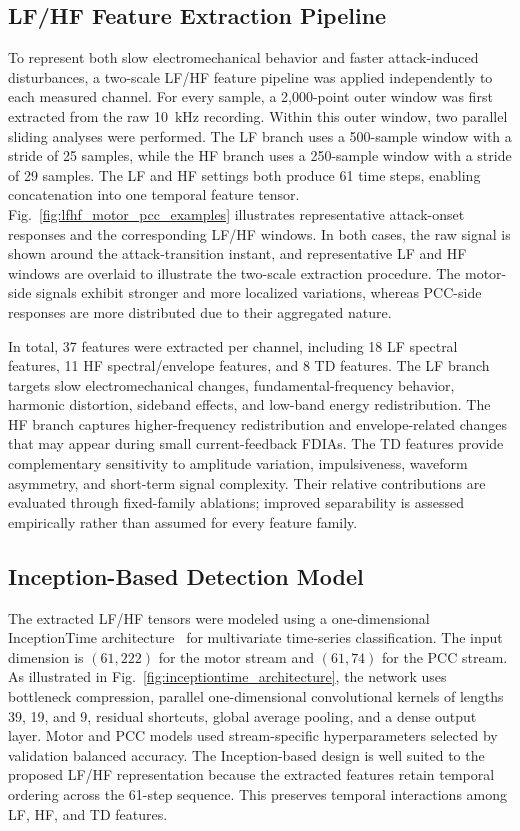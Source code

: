 \documentclass[letterpaper,journal]{IEEEtran}
\begin{document}
\subsection{LF/HF Feature Extraction Pipeline}
\label{sec:lfhf_features}


To represent both slow electromechanical behavior and faster attack-induced disturbances, a two-scale LF/HF feature pipeline was applied independently to each measured channel. For every sample, a 2{,}000-point outer window was first extracted from the raw 10~kHz recording. Within this outer window, two parallel sliding analyses were performed. The LF branch uses a 500-sample window with a stride of 25 samples, while the HF branch uses a 250-sample window with a stride of 29 samples. The LF and HF settings both produce 61 time steps, enabling concatenation into one temporal feature tensor. 
Fig.~\ref{fig:lfhf_motor_pcc_examples} illustrates representative attack-onset responses and the corresponding LF/HF windows. In both cases, the raw signal is shown around the attack-transition instant, and representative LF and HF windows are overlaid to illustrate the two-scale extraction procedure. The motor-side signals exhibit stronger and more localized variations, whereas PCC-side responses are more distributed due to their aggregated nature.

In total, 37 features were extracted per channel, including 18 LF spectral features, 11 HF spectral/envelope features, and 8 TD features. The LF branch targets slow electromechanical changes, fundamental-frequency behavior, harmonic distortion, sideband effects, and low-band energy redistribution. The HF branch captures higher-frequency redistribution and envelope-related changes that may appear during small current-feedback FDIAs. The TD features provide complementary sensitivity to amplitude variation, impulsiveness, waveform asymmetry, and short-term signal complexity.
Their relative contributions are evaluated through fixed-family ablations; improved separability is assessed empirically rather than assumed for every feature family.

\subsection{Inception-Based Detection Model}
\label{sec:inception_model}

The extracted LF/HF tensors were modeled using a one-dimensional InceptionTime architecture~\cite{fawaz2020inceptiontime} for multivariate time-series classification. The input dimension is $(61,222)$ for the motor stream and $(61,74)$ for the PCC stream. As illustrated in Fig.~\ref{fig:inceptiontime_architecture}, the network uses bottleneck compression, parallel one-dimensional convolutional kernels of lengths 39, 19, and 9, residual shortcuts, global average pooling, and a dense output layer. Motor and PCC models used stream-specific hyperparameters selected by validation balanced accuracy. The Inception-based design is well suited to the proposed LF/HF representation because the extracted features retain temporal ordering across the 61-step sequence. This preserves temporal interactions among LF, HF, and TD features.
\end{document}
